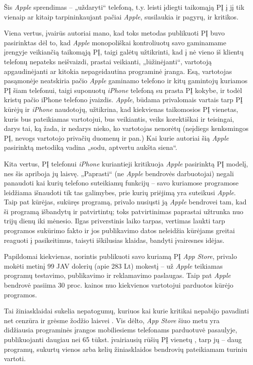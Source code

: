 \documentclass[kursinis-darbas]{vukf}
\begin{document}
Šis \emph{Apple} sprendimas – „uždaryti“ telefoną, t.y. leisti įdiegti taikomąją PĮ į jį tik vienaip ar kitaip tarpininkaujant pačiai \emph{Apple}, susilaukia ir pagyrų, ir kritikos.

Viena vertus, įvairūs autoriai mano, kad toks metodas publikuoti PĮ buvo pasirinktas dėl to, kad \emph{Apple} monopoliškai kontroliuotų savo gaminamame įrengyje veikiančią taikomąją PĮ, taigi galėtų užtikrinti, kad į nė vieno iš klientų telefonų nepateks neišvaizdi, prastai veikianti, „lūžinėjanti“, vartotoją apgaudinėjanti ar kitokia nepageidautina programinė įranga. Esą, vartotojas pasąmonėje neatskiria pačio \emph{Apple} gaminamo telefono ir kitų gamintojų kuriamos PĮ šiam telefonui, taigi suponuotų \emph{iPhone} telefoną su prasta PĮ kokybe, ir todėl kristų pačio iPhone telefono įvaizdis. \emph{Apple}, būdama privalomais vartais tarp PĮ kūrėjų ir \emph{iPhone} naudotojų, užtikrina, kad kiekvienas taikomosios PĮ vienetas, kuris bus pateikiamas vartotojui, bus veikiantis, veiks korektiškai ir teisingai, darys tai, ką žada, ir nedarys nieko, ko vartotojas nenorėtų (neįdiegs kenksmingos PĮ, nevogs vartotojo privačių duomenų ir pan.) Kai kurie autoriai \cite{techcrunch_apples_app_store_the_new_walled_garden} šią \emph{Apple} pasirinktą metodiką vadina „sodu, aptvertu aukšta siena“.

Kita vertus, PĮ telefonui \emph{iPhone} kuriantieji kritikuoja \emph{Apple} pasirinktą PĮ modelį, nes šis apriboja jų laisvę. „Paprasti“ (ne \emph{Apple} bendrovės darbuotojai) negali panaudoti kai kurių telefono suteikiamų funkcijų – savo kuriamose programose leidžiama išnaudoti tik tas galimybes, prie kurių priėjimą yra suteikusi \emph{Apple}. Taip pat kūrėjas, sukūręs programą, privalo nusiųsti ją \emph{Apple} bendrovei tam, kad ši programą išbandytų ir patvirtintų; toks patvirtinimas paprastai užtrunka nuo trijų dienų iki mėnesio. Ilgas priverstinis laiko tarpas, vertimas laukti tarp programos sukūrimo fakto ir jos publikavimo datos neleidžia kūrėjams greitai reaguoti į pasikeitimus, taisyti iškilusias klaidas, bandyti įvairesnes idėjas.

Papildomai kiekvienas, norintis publikuoti savo kuriamą PĮ \emph{App Store}, privalo mokėti metinį 99 JAV dolerių (apie 283 Lt) mokestį – už \emph{Apple} teikiamas programų testavimo, publikavimo ir reklamavimo paslaugas. Taip pat \emph{Apple} bendrovė pasiima 30 proc. kainos nuo kiekvienos vartotojui parduotos kūrėjo programos.

Tai žiniasklaidai sukelia nepatogumų, kuriuos kai kurie kritikai nepabijo pavadinti net cenzūra ir grėsme žodžio laisvei \cite{arstechnica_apple_and_app_store_censorship_where_to_draw_the_line}. Vis dėlto, \emph{App Store} šiuo metu yra didžiausia programinės įrangos mobiliesiems telefonams parduotuvė pasaulyje, publikuojanti daugiau nei 65 tūkst. įvairiausių rūšių PĮ vienetų \cite{apple_app_store_downloads_top_1_point_5_billion_in_first_year}, tarp jų – daug programų, sukurtų vienos arba kelių žiniasklaidos bendrovių pateikiamam turiniu vartoti.
\end{document}
